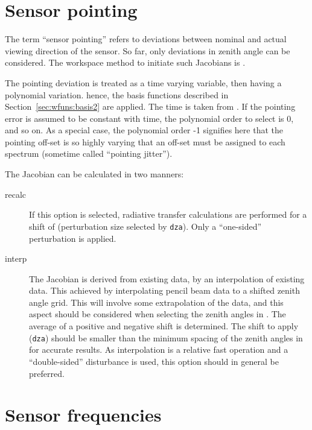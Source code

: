 \section{Sensor pointing}
\label{sec:wfuns:sensorpointing}

The term ``sensor pointing'' refers to deviations between nominal and
actual viewing direction of the sensor. So far, only deviations in zenith angle
can be considered. The workspace method to initiate such Jacobians is
.

The pointing deviation is treated as a time varying variable, then having a
polynomial variation. hence, the basis functions described in
Section~\ref{sec:wfuns:basis2} are applied. The time is taken from
. If the pointing error is assumed to be constant with
time, the polynomial order to select is 0, and so on. As a special case, the
polynomial order -1 signifies here that the pointing off-set is so highly
varying that an off-set must be assigned to each spectrum
(sometime called ``pointing jitter'').

The Jacobian can be calculated in two manners:
\begin{description}
\item[recalc] If this option is selected, radiative transfer calculations are
  performed for a shift of  (perturbation size selected
  by \verb|dza|). Only a ``one-sided'' perturbation is applied.
\item[interp] The Jacobian is derived from existing data, by an interpolation
  of existing data. This achieved by interpolating pencil beam data to a
  shifted zenith angle grid. This will involve some extrapolation of the data,
  and this aspect should be considered when selecting the zenith angles in
  . The average of a positive and negative shift
  is determined. The shift to apply (\verb|dza|) should be smaller than the
  minimum spacing of the zenith angles in for
  accurate results. As interpolation is a relative fast operation and a
  ``double-sided'' disturbance is used, this option should in general be
  preferred.
\end{description}




\section{Sensor frequencies}
\label{sec:wfuns:sensorfreq}

